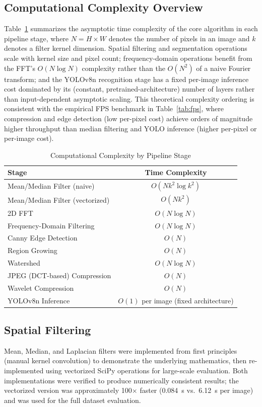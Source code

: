 \documentclass[conference]{IEEEtran}
\begin{document}
\subsection{Computational Complexity Overview}
Table~\ref{tab:complexity} summarizes the asymptotic time complexity of the core algorithm in each pipeline stage, where $N = H \times W$ denotes the number of pixels in an image and $k$ denotes a filter kernel dimension. Spatial filtering and segmentation operations scale with kernel size and pixel count; frequency-domain operations benefit from the FFT's $O(N \log N)$ complexity rather than the $O(N^2)$ of a naive Fourier transform; and the YOLOv8n recognition stage has a fixed per-image inference cost dominated by its (constant, pretrained-architecture) number of layers rather than input-dependent asymptotic scaling. This theoretical complexity ordering is consistent with the empirical FPS benchmark in Table~\ref{tab:fps}, where compression and edge detection (low per-pixel cost) achieve orders of magnitude higher throughput than median filtering and YOLO inference (higher per-pixel or per-image cost).

\begin{table}[h]
\caption{Computational Complexity by Pipeline Stage}
\label{tab:complexity}
\centering
\begin{tabular}{lc}
\toprule
Stage & Time Complexity \\
\midrule
Mean/Median Filter (naive) & $O(N k^2 \log k^2)$ \\
Mean/Median Filter (vectorized) & $O(N k^2)$ \\
2D FFT & $O(N \log N)$ \\
Frequency-Domain Filtering & $O(N \log N)$ \\
Canny Edge Detection & $O(N)$ \\
Region Growing & $O(N)$ \\
Watershed & $O(N \log N)$ \\
JPEG (DCT-based) Compression & $O(N)$ \\
Wavelet Compression & $O(N)$ \\
YOLOv8n Inference & $O(1)$ per image (fixed architecture) \\
\bottomrule
\end{tabular}
\end{table}

\subsection{Spatial Filtering}
Mean, Median, and Laplacian filters were implemented from first principles (manual kernel convolution) to demonstrate the underlying mathematics, then re-implemented using vectorized SciPy operations for large-scale evaluation. Both implementations were verified to produce numerically consistent results; the vectorized version was approximately 100$\times$ faster (0.084~s vs.\ 6.12~s per image) and was used for the full dataset evaluation.
\end{document}
